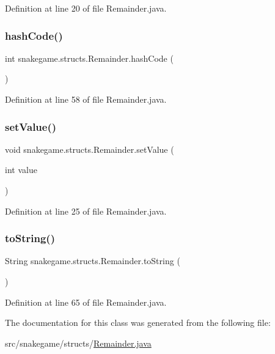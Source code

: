 Definition at line 20 of file Remainder.\+java.

\mbox{\label{classsnakegame_1_1structs_1_1_remainder_a65f6ae72c496323b19f05bbc93269127}} 
\subsubsection{\texorpdfstring{hash\+Code()}{hashCode()}}
{\footnotesize\ttfamily int snakegame.\+structs.\+Remainder.\+hash\+Code (\begin{DoxyParamCaption}{ }\end{DoxyParamCaption})}



Definition at line 58 of file Remainder.\+java.

\mbox{\label{classsnakegame_1_1structs_1_1_remainder_ac280dde02bcc57ea35c8c7617cb57767}} 
\subsubsection{\texorpdfstring{set\+Value()}{setValue()}}
{\footnotesize\ttfamily void snakegame.\+structs.\+Remainder.\+set\+Value (\begin{DoxyParamCaption}\item[{int}]{value }\end{DoxyParamCaption})}



Definition at line 25 of file Remainder.\+java.

\mbox{\label{classsnakegame_1_1structs_1_1_remainder_a6d69e20d1a02d3feac7ce7873ed4d172}} 
\subsubsection{\texorpdfstring{to\+String()}{toString()}}
{\footnotesize\ttfamily String snakegame.\+structs.\+Remainder.\+to\+String (\begin{DoxyParamCaption}{ }\end{DoxyParamCaption})}



Definition at line 65 of file Remainder.\+java.



The documentation for this class was generated from the following file\+:\begin{DoxyCompactItemize}
\item 
src/snakegame/structs/\mbox{\hyperlink{_remainder_8java}{Remainder.\+java}}\end{DoxyCompactItemize}
